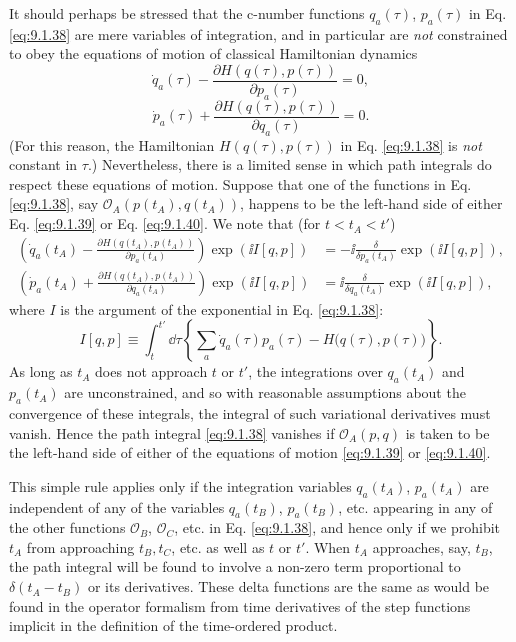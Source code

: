 It should perhaps be stressed that the c-number functions $q_a(\tau)$,
$p_a(\tau)$ in Eq. \eqref{eq:9.1.38} are mere variables of integration, and in
particular are \emph{not} constrained to obey the equations of motion of
classical Hamiltonian dynamics
\begin{equation}
  \dot q_a(\tau)-
  \frac{\partial H(q(\tau),p(\tau))}{\partial p_a(\tau)}=0,
  \tag{9.1.39}\label{eq:9.1.39}
\end{equation}
\begin{equation}
  \dot p_a(\tau)+
  \frac{\partial H(q(\tau),p(\tau))}{\partial q_a(\tau)}=0.
  \tag{9.1.40}\label{eq:9.1.40}
\end{equation}
(For this reason, the Hamiltonian $H(q(\tau),p(\tau))$ in Eq. \eqref{eq:9.1.38} is
\emph{not} constant in $\tau$.) Nevertheless, there is a limited sense in
which path integrals do respect these equations of motion. Suppose that one
of the functions in Eq. \eqref{eq:9.1.38}, say
$\mathcal{O}_A(p(t_A),q(t_A))$, happens to be the left-hand side of either
Eq. \eqref{eq:9.1.39} or Eq. \eqref{eq:9.1.40}. We note that (for $t<t_A<t'$)
\begin{align*}
  \left(\dot q_a(t_A)-
  \frac{\partial H(q(t_A),p(t_A))}{\partial p_a(t_A)}\right)
  \exp(\ii I[q,p])
  &=-\ii\frac{\delta}{\delta p_a(t_A)}\exp(\ii I[q,p]),\\
  \left(\dot p_a(t_A)+
  \frac{\partial H(q(t_A),p(t_A))}{\partial q_a(t_A)}\right)
  \exp(\ii I[q,p])
  &=\ii\frac{\delta}{\delta q_a(t_A)}\exp(\ii I[q,p]),
\end{align*}
where $I$ is the argument of the exponential in Eq. \eqref{eq:9.1.38}:
\[
  I[q,p]\equiv\int_t^{t'}\dd\tau
  \left\{\sum_a\dot q_a(\tau)p_a(\tau)
  -H\bigl(q(\tau),p(\tau)\bigr)\right\}.
\]
As long as $t_A$ does not approach $t$ or $t'$, the integrations over
$q_a(t_A)$ and $p_a(t_A)$ are unconstrained, and so with reasonable
assumptions about the convergence of these integrals, the integral of such
variational derivatives must vanish. Hence the path integral \eqref{eq:9.1.38}
vanishes if $\mathcal{O}_A(p,q)$ is taken to be the left-hand side of either
of the equations of motion \eqref{eq:9.1.39} or \eqref{eq:9.1.40}.

This simple rule applies only if the integration variables $q_a(t_A)$,
$p_a(t_A)$ are independent of any of the variables $q_a(t_B)$, $p_a(t_B)$,
etc. appearing in any of the other functions $\mathcal{O}_B$,
$\mathcal{O}_C$, etc. in Eq. \eqref{eq:9.1.38}, and hence only if we prohibit $t_A$
from approaching $t_B,t_C$, etc. as well as $t$ or $t'$. When $t_A$
approaches, say, $t_B$, the path integral will be found to involve a non-zero
term proportional to $\delta(t_A-t_B)$ or its derivatives. These delta
functions are the same as would be found in the operator formalism from
time derivatives of the step functions implicit in the definition of the
time-ordered product.

